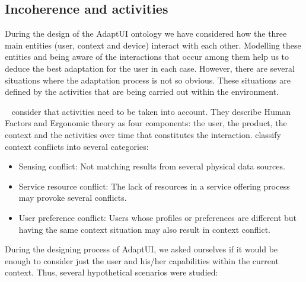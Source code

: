 

\subsection{Incoherence and activities}
\label{sec:incoherence}

During the design of the AdaptUI ontology we have considered how the three
main entities (user, context and device) interact with each other. Modelling
these entities and being aware of the interactions that occur among them help
us to deduce the best adaptation for the user in each case. However, there are
several situations where the adaptation process is not so obvious. These situations
are defined by the activities that are being carried out within the environment.

\citet{persad_characterising_2007}~\citep{persad_cognitive_2007}
consider that activities need to be taken into account. They describe Human
Factors and Ergonomic theory as four components: the user, the product, the context
and the activities over time that constitutes the interaction.
\citet{hong_context_aware_2009} classify context conflicts into several categories:

\begin{itemize}
 \item Sensing conflict: Not matching results from several physical data sources.
 
 \item Service resource conflict: The lack of resources in a service offering
 process may provoke several conflicts.
 
 \item User preference conflict: Users whose profiles or preferences are different
 but having the same context situation may also result in context conflict.
\end{itemize}

During the designing process of AdaptUI, we asked ourselves if it would be enough
to consider just the user and his/her capabilities within the current context.
Thus, several hypothetical scenarios were studied:

